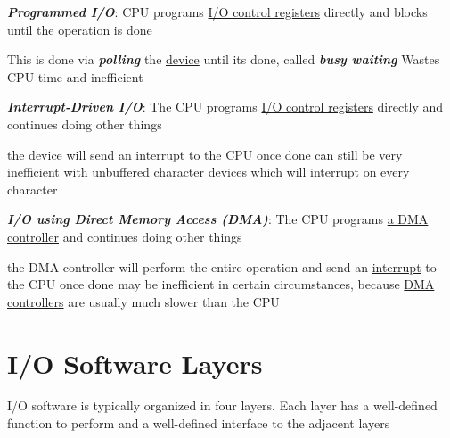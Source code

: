 \begin{enumerate}
    \def\labelenumi{\arabic{enumi}.}

    \vItem
          \textbf{ \textit{Programmed I/O}}: CPU programs \ul{I/O control registers} directly and
          blocks until the operation is done

          \begin{itemize}

              \vItem
                    This is done via \textbf{ \textit{polling}} the \ul{device} until its done, called
                    \textbf{ \textit{busy waiting}}
              \vItem
                    Wastes CPU time and inefficient
          \end{itemize}
    \vItem
          \textbf{ \textit{Interrupt-Driven I/O}}: The CPU programs
          \ul{I/O control registers} directly and continues doing other things

          \begin{itemize}

              \vItem
                    the \ul{device} will
                    send an \ul{interrupt} to the CPU
                    once done
              \vItem
                    can still be very inefficient with unbuffered \ul{character devices} which will
                    interrupt on every character
          \end{itemize}
    \vItem
          \textbf{ \textit{I/O using Direct Memory Access (DMA)}}: The CPU programs
          \ul{a DMA controller} and
          continues doing other things

          \begin{itemize}

              \vItem
                    the DMA controller will perform the entire operation and send an
                    \ul{interrupt} to the CPU once done
              \vItem
                    may be inefficient in certain circumstances, because \ul{DMA controllers} are usually much
                    slower than the CPU
          \end{itemize}
\end{enumerate}

\section*{I/O Software Layers}

I/O software is typically organized in four layers. Each layer has a
well-defined function to perform and a well-defined interface to the
adjacent layers

